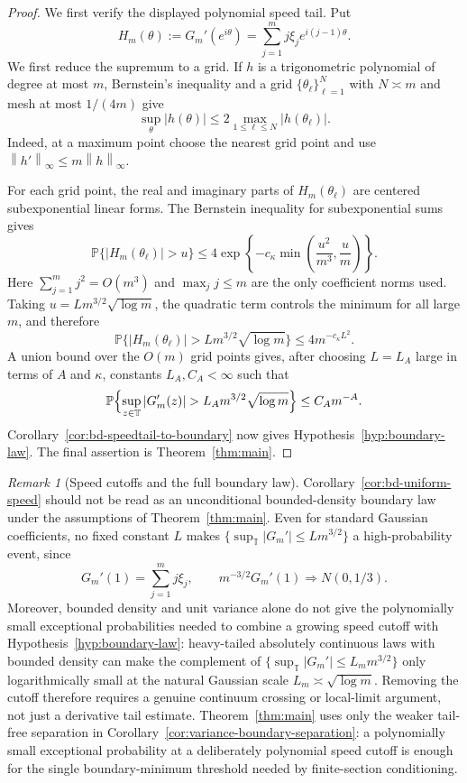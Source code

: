 \documentclass[11pt]{amsart}
\numberwithin{equation}{section}
\theoremstyle{definition}
\theoremstyle{remark}
\newtheorem{remark}[theorem]{Remark}
\newcommand{\T}{\mathbb T}
\newcommand{\Prob}{\mathbb P}
\newcommand{\norm}[1]{\left\lVert #1\right\rVert}
\newcommand{\abs}[1]{\left\lvert #1\right\rvert}
\begin{document}
\begin{proof}
We first verify the displayed polynomial speed tail.  Put
\[
  H_m(\theta):=G_m'(e^{i\theta})
  =\sum_{j=1}^m j\xi_j e^{i(j-1)\theta}.
\]
We first reduce the supremum to a grid.  If \(h\) is a trigonometric polynomial
of degree at most \(m\), Bernstein's inequality and a grid
\(\{\theta_\ell\}_{\ell=1}^N\) with \(N\asymp m\) and mesh at most \(1/(4m)\)
give
\[
  \sup_\theta\abs{h(\theta)}
  \le 2\max_{1\le\ell\le N}\abs{h(\theta_\ell)}.
\]
Indeed, at a maximum point choose the nearest grid point and use
\(\norm{h'}_\infty\le m\norm{h}_\infty\).

For each grid point, the real and imaginary parts of \(H_m(\theta_\ell)\) are
centered subexponential linear forms.  The Bernstein inequality for
subexponential sums \cite[Thm.~2.8.1]{VershyninHDP} gives
\[
  \Prob\{\abs{H_m(\theta_\ell)}>u\}
  \le
  4\exp\left\{-c_\kappa
  \min\left(\frac{u^2}{m^3},\frac{u}{m}\right)\right\}.
\]
Here \(\sum_{j=1}^m j^2=O(m^3)\) and \(\max_j j\le m\) are the only coefficient
norms used.  Taking \(u=Lm^{3/2}\sqrt{\log m}\), the quadratic term controls the
minimum for all large \(m\), and therefore
\[
  \Prob\{\abs{H_m(\theta_\ell)}>Lm^{3/2}\sqrt{\log m}\}
  \le 4m^{-c_\kappa L^2}.
\]
A union bound over the \(O(m)\) grid points gives, after choosing \(L=L_A\) large
in terms of \(A\) and \(\kappa\), constants \(L_A,C_A<\infty\) such that
\[
  \Prob\Bigl\{\sup_{z\in\T}\abs{G_m'(z)}
    >L_A m^{3/2}\sqrt{\log m}\Bigr\}
  \le C_A m^{-A}.
\]
Corollary~\ref{cor:bd-speedtail-to-boundary} now gives
Hypothesis~\ref{hyp:boundary-law}.  The final assertion is
Theorem~\ref{thm:main}.
\end{proof}

\begin{remark}[Speed cutoffs and the full boundary law]\label{rem:speed-extra}
Corollary~\ref{cor:bd-uniform-speed} should not be read as an unconditional
bounded-density boundary law under the assumptions of Theorem~\ref{thm:main}.
Even for standard Gaussian coefficients, no fixed constant \(L\) makes
\(\{\sup_{\T}|G_m'|\le Lm^{3/2}\}\) a high-probability event, since
\[
  G_m'(1)=\sum_{j=1}^m j\xi_j,\qquad
  m^{-3/2}G_m'(1)\Longrightarrow N(0,1/3).
\]
Moreover, bounded density and unit variance alone do not give the polynomially
small exceptional probabilities needed to combine a growing speed cutoff with
Hypothesis~\ref{hyp:boundary-law}: heavy-tailed absolutely continuous laws with
bounded density can make the complement of
\(\{\sup_{\T}|G_m'|\le L_m m^{3/2}\}\) only logarithmically small at the natural
Gaussian scale \(L_m\asymp\sqrt{\log m}\).  Removing the cutoff therefore
requires a genuine continuum crossing or local-limit argument, not just a
derivative tail estimate.  Theorem~\ref{thm:main} uses only the weaker
tail-free separation in Corollary~\ref{cor:variance-boundary-separation}: a
polynomially small exceptional probability at a deliberately polynomial speed
cutoff is enough for the single boundary-minimum threshold needed by
finite-section conditioning.
\end{remark}
\end{document}
